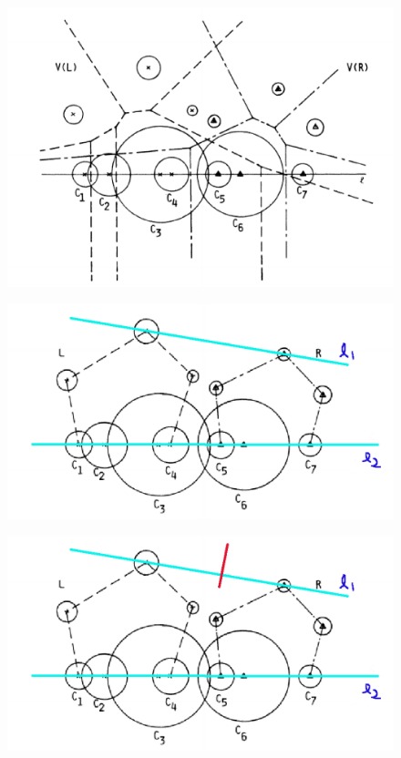 \documentclass[12pt]{article}
\begin{document}
\begin{CJK}{UTF8}{bkai}
\begin{figure}[h]
\includegraphics[scale=0.4]{figure6.eps}
\caption{}
\end{figure}

\begin{figure}[h]
\includegraphics[scale=0.4]{figure7.eps}
\caption{}
\end{figure}

\begin{figure}[h]
\includegraphics[scale=0.4]{figure8.eps}
\caption{}
\end{figure}


\end{CJK}
\end{document}
